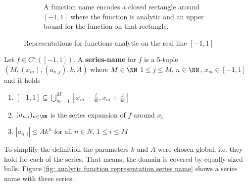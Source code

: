 \begin{figure}
\begin{subfigure}{.45\textwidth}
			\caption{A function name encodes a closed rectangle around $[-1,1]$ where the function is analytic and an upper bound for the function on that rectangle.}\label{fig: analytic function representation function name}
		\end{subfigure}
		\caption{Representations for functions analytic on the real line $[-1,1]$}\label{fig: analytic function representations}
	 \end{figure}
	\begin{definition}\label{def:series_name_rect}
		Let $f \in C^\omega([-1,1])$.
		A \textbf{series-name} for $f$ is a 5-tuple $(M, (x_m), (a_{n, j}), k, A)$ where $M \in \NN$
		$1 \leq j \leq M$, $n \in \NN$, $x_m \in [-1,1]$ and it holds
		\begin{enumerate}
			\item $[-1,1] \subseteq \bigcup_{m=1}^M [x_m - \frac{i}{4k}, x_m + \frac{1}{4k}]$
			\item $(a_{n,i})_{n \in \NN}$ is the series expansion of $f$ around $x_i$
			\item $|a_{n,i}| \leq Ak^n$ for all $n \in N$, $1 \leq i \leq M$
		\end{enumerate}
	\end{definition}
	To simplify the definition the parameters $k$ and $A$ were chosen global, i.e. they hold for each of the series.
	That means, the domain is covered by equally sized balls. 
	Figure \ref{fig: analytic function representation series name} shows a series name with three series.
	
